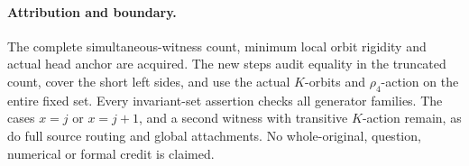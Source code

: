 \documentclass[11pt,a4paper]{article}
\begin{document}
\paragraph{Attribution and boundary.}
The complete simultaneous-witness count, minimum
local orbit rigidity and actual head anchor are
acquired. The new steps audit equality in
the truncated count, cover the short left sides,
and use the actual $K$-orbits
and $\rho_4$-action on the entire fixed set.
Every invariant-set assertion checks all generator
families. The cases $x=j$ or $x=j+1$, and a
second witness with transitive $K$-action remain,
as do full source routing and global attachments.
No whole-original, question, numerical or formal
credit is claimed.
\end{document}
